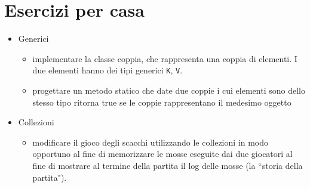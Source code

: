 \documentclass{article}
\begin{document}
%
%
%
%	
%
%
%
%
%	
%	
%
%	

\section{Esercizi per casa}
\begin{itemize}
\item Generici
\begin{itemize}
\item implementare la classe coppia, che rappresenta una coppia di elementi. I due elementi hanno dei tipi generici \texttt{K}, \texttt{V}.
\item progettare un metodo statico che date due coppie i cui elementi sono dello stesso tipo ritorna true se le coppie rappresentano il medesimo oggetto
\end{itemize} 
\item Collezioni
\begin{itemize}
\item modificare il gioco degli scacchi utilizzando le collezioni in modo opportuno al fine di memorizzare le mosse eseguite dai due giocatori al fine di mostrare al termine della partita  il log delle mosse (la ``storia della partita").
\end{itemize}
\end{itemize}


\clearpage







\nocite{*}
\end{document}
